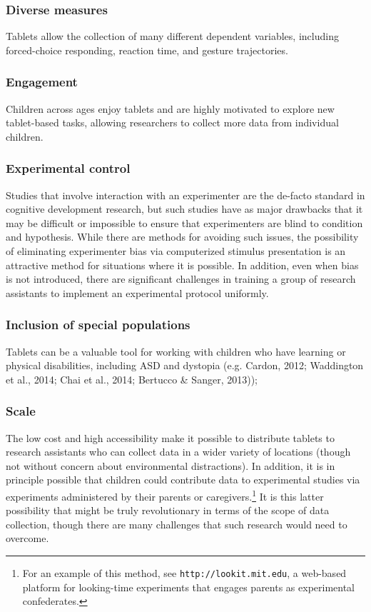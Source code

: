 \documentclass[man,noapacite]{apa2}
\begin{document}
\subsubsection{Diverse measures} Tablets allow the collection of many different dependent variables, including forced-choice responding, reaction time, and gesture trajectories.

\subsubsection{Engagement} Children across ages enjoy tablets and are highly motivated to explore new tablet-based tasks, allowing researchers to collect more data from individual children.

\subsubsection{Experimental control} Studies that involve interaction with an experimenter are the de-facto standard in cognitive development research, but such studies have as major drawbacks that it may be difficult or impossible to ensure that experimenters are blind to condition and hypothesis. While there are methods for avoiding such issues, the possibility of eliminating experimenter bias via computerized stimulus presentation is an attractive method for situations where it is possible. In addition, even when bias is not introduced, there are significant challenges in training a group of research assistants to implement an experimental protocol uniformly. 

\subsubsection{Inclusion of special populations} Tablets can be a valuable tool for working with children who have learning or physical disabilities, including ASD and dystopia (e.g. Cardon, 2012; Waddington et al., 2014; Chai et al., 2014; Bertucco \& Sanger, 2013)); 

\subsubsection{Scale} The low cost and high accessibility make it possible to distribute tablets to research assistants who can collect data in a wider variety of locations (though not without concern about environmental distractions). In addition, it is in principle possible that children could contribute data to experimental studies via experiments administered by their parents or caregivers.\footnote{For an example of this method, see \texttt{http://lookit.mit.edu}, a web-based platform for looking-time experiments that engages parents as experimental confederates.} It is this latter possibility that might be truly revolutionary in terms of the scope of data collection, though there are many challenges that such research would need to overcome.
\end{document}
